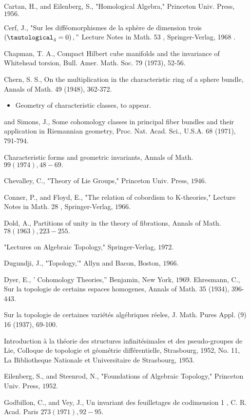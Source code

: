 \documentclass[10pt]{article}
\begin{document}
Cartan, H., and Eilenberg, S., "Homological Algebra," Princeton Univ. Press, $1956 .$

Cerf, J., "Sur les difféomorphismes de la sphère de dimension trois $\left(\tautological_{4}=0\right), "$ Lecture Notes in Math. 53 , Springer-Verlag, 1968 .

Chapman, T. A., Compact Hilbert cube manifolds and the invariance of Whitehead torsion, Bull. Amer. Math. Soc. 79 (1973), 52-56.

Chern, S. S., On the multiplication in the characteristic ring of a sphere bundle, Annals of Math. 49 (1948), 362-372.

\begin{itemize}
  \item Geometry of characteristic classes, to appear.
\end{itemize}
and Simons, J., Some cohomology classes in principal fiber bundles and their application in Riemannian geometry, Proc. Nat. Acad. Sci., U.S.A. 68 (1971), 791-794.

Characteristic forms and geometric invariants, Annals of Math. $99(1974), 48-69 .$

Chevalley, C., "Theory of Lie Groups," Princeton Univ. Press, $1946 .$

Conner, P., and Floyd, E., "The relation of cobordism to $\mathrm{K}$-theories," Lecture Notes in Math. 28 , Springer-Verlag, $1966 .$

Dold, A., Partitions of unity in the theory of fibrations, Annals of Math. $78(1963), 223-255 .$

"Lectures on Algebraic Topology," Springer-Verlag, $1972 .$

Dugundji, J., "Topology,'" Allyn and Bacon, Boston, $1966 .$

Dyer, E., ' Cohomology Theories,'' Benjamin, New York, $1969 .$ Ehresmann, C., Sur la topologie de certains espaces homogenes, Annals of Math. 35 (1934), 396-443.

Sur la topologie de certaines variétés algébriques réeles, J. Math. Pures Appl. (9) 16 (1937), 69-100.

Introduction à la théorie des structures infinitésimales et des pseudo-groupes de Lie, Colloque de topologie et géométrie différentielle, Strasbourg, 1952, No. 11, La Bibliotheque Nationale et Universitaire de Strasbourg, $1953 .$

Eilenberg, S., and Steenrod, N., "Foundations of Algebraic Topology," Princeton Univ. Press, $1952 .$

Godbillon, C., and Vey, J., Un invariant des feuilletages de codimension 1 , C. R. Acad. Paris $273(1971), 92-95 .$
\end{document}
